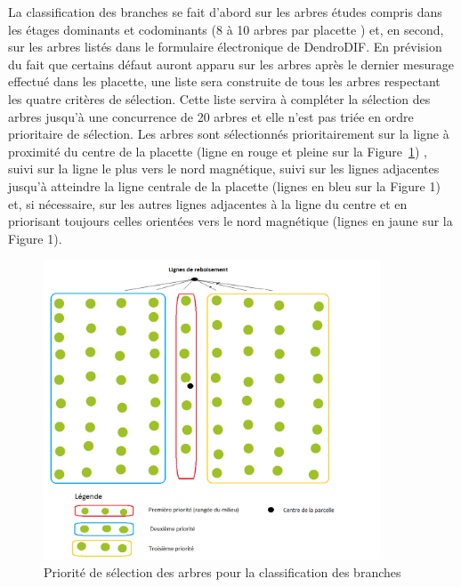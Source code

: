 \documentclass[letterpaper, 12pt]{article}
\begin{document}
\begin{onehalfspace}
La classification des branches se fait d’abord sur les arbres études compris dans les étages dominants et codominants (8 à 10 arbres par placette %
) et, en second, sur les arbres listés dans le formulaire électronique de DendroDIF. %
En prévision du fait que certains défaut auront apparu sur les arbres après le dernier mesurage effectué dans les placette, une liste sera construite de tous les arbres respectant les quatre critères de sélection. %
Cette liste servira à compléter la sélection des arbres jusqu’à une concurrence de 20 arbres et elle n’est pas triée en ordre prioritaire de sélection. Les arbres sont sélectionnés prioritairement sur la ligne à proximité du centre de la placette (ligne en rouge et pleine sur la Figure~\ref{select}) %
, suivi sur la ligne le plus vers le nord magnétique, suivi sur les lignes adjacentes jusqu’à atteindre la ligne centrale de la placette  (lignes en bleu sur  la Figure 1) et, si nécessaire, sur les autres lignes adjacentes à la ligne du centre et en priorisant toujours celles orientées vers le nord magnétique (lignes en jaune sur la Figure 1).

\vspace{12pt}

\begin{figure}
	\centering
	\includegraphics[width=10cm]{Figure1}
	\caption{Priorité de sélection des arbres pour la classification des branches}
	\label{select}
\end{figure}


\end{onehalfspace}
\end{document}
